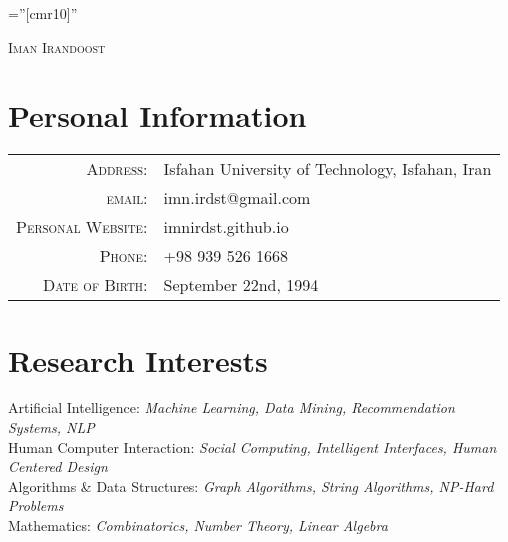 \documentclass[a4paper,10pt]{article}
\makeatletter
\newcommand{\interestItem}[2]{
	\textbullet\textnormal{ #1: }\emph{\color{darkgray}\small #2}}
\newcommand{\linkSign}{
	{\footnotesize\space\faExternalLink}}
\newcommand{\myEmailLink}{mailto:imn.irdst@gmail.com}
\newcommand{\mySiteLink}{https://imnirdst.github.io/}
\makeatother
\begin{document}
	
	\pagestyle{empty} %
	
	\font\fb=''[cmr10]'' %
	
	\par{\centering
		{\Huge \textsc{Iman Irandoost}
		}\bigskip\par}
	
	
	\section{Personal Information}
		\begin{tabular}{rl}
			\textsc{Address:}   & Isfahan University of Technology, Isfahan, Iran \\
			\textsc{email:}     & imn.irdst@gmail.com\href{\myEmailLink}{\linkSign}\\
			\textsc{Personal Website:}     & imnirdst.github.io\href{\mySiteLink}{\linkSign}\\
			\textsc{Phone:}     & +98 939 526 1668\\
			\textsc{Date of Birth:} & September 22nd, 1994
		\end{tabular}
	\section{Research Interests}
		\interestItem{Artificial Intelligence}{Machine Learning, Data Mining, Recommendation Systems, NLP}\vspace{1 mm}\\
		\interestItem{Human Computer Interaction}{Social Computing, Intelligent Interfaces, Human Centered Design}\vspace{1 mm} \\
		\interestItem{Algorithms \& Data Structures}{Graph Algorithms, String Algorithms, NP-Hard Problems}\vspace{1 mm}\\
		\interestItem{Mathematics}{Combinatorics, Number Theory, Linear Algebra}
\end{document}
